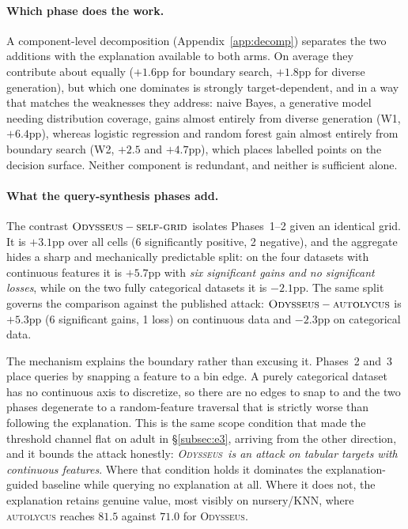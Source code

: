 \documentclass[sigconf,anonymous,review]{acmart}
\newcommand{\sys}{\textsc{Odysseus}}
\begin{document}
\paragraph{Which phase does the work.} A component-level decomposition
(Appendix~\ref{app:decomp}) separates the two additions with the explanation available to both arms. On average they contribute about equally ($+1.6$pp for boundary search, $+1.8$pp for
diverse generation), but which one dominates is strongly target-dependent, and in a way that matches
the weaknesses they address: naive Bayes, a generative model needing distribution coverage, gains almost entirely from diverse generation (W1, $+6.4$pp), whereas logistic regression and random forest
gain almost entirely from boundary search (W2, $+2.5$ and $+4.7$pp), which places labelled points on
the decision surface. Neither component is redundant, and neither is sufficient alone.

\paragraph{What the query-synthesis phases add.} The contrast
$\sys-\textsc{self-grid}$ isolates Phases~1--2 given an identical grid. It is
$+3.1$pp over all cells (6 significantly positive, 2 negative), and the aggregate hides a sharp and
mechanically predictable split: on the four datasets with continuous features it is $+5.7$pp with
\emph{six significant gains and no significant losses}, while on the two fully categorical datasets it
is $-2.1$pp. The same split governs the comparison against the published attack:
$\sys-\textsc{autolycus}$ is $+5.3$pp (6 significant gains, 1 loss) on continuous data
and $-2.3$pp on categorical data.

The mechanism explains the boundary rather than excusing it. Phases~2 and~3 place queries by snapping
a feature to a bin edge. A purely categorical dataset has no continuous axis to discretize, so there
are no edges to snap to and the two phases degenerate to a random-feature traversal that is strictly
worse than following the explanation. This is the same scope condition that made the threshold channel
flat on adult in \S\ref{subsec:e3}, arriving from the other direction, and it bounds the attack
honestly: \emph{\sys\ is an attack on tabular targets with continuous features}. Where
that condition holds it dominates the explanation-guided baseline while querying no explanation at all. Where it does not, the explanation retains genuine value, most visibly on nursery/KNN, where
\textsc{autolycus} reaches $81.5$ against $71.0$ for \sys.
\end{document}

